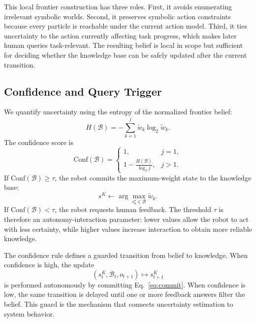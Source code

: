 This local frontier construction has three roles. First, it avoids enumerating irrelevant symbolic worlds. Second, it preserves symbolic action constraints because every particle is reachable under the current action model. Third, it ties uncertainty to the action currently affecting task progress, which makes later human queries task-relevant. The resulting belief is local in scope but sufficient for deciding whether the knowledge base can be safely updated after the current transition.

\subsection{Confidence and Query Trigger}

We quantify uncertainty using the entropy of the normalized frontier belief:
\begin{equation}
H(\mathcal{B})=-\sum_{k=1}^{j}\tilde{w}_k\log_2 \tilde{w}_k.
\label{eq:entropy}
\end{equation}
The confidence score is
\begin{equation}
\mathrm{Conf}(\mathcal{B})=
\begin{cases}
1, & j=1,\\
1-\frac{H(\mathcal{B})}{\log_2 j}, & j>1.
\end{cases}
\label{eq:confidence}
\end{equation}
If $\mathrm{Conf}(\mathcal{B})\geq \tau$, the robot commits the maximum-weight state to the knowledge base:
\begin{equation}
s^K \leftarrow \arg\max_{s_k^\star \in \mathcal{B}}\tilde{w}_k.
\label{eq:commit}
\end{equation}
If $\mathrm{Conf}(\mathcal{B})<\tau$, the robot requests human feedback. The threshold $\tau$ is therefore an autonomy-interaction parameter: lower values allow the robot to act with less certainty, while higher values increase interaction to obtain more reliable knowledge.

The confidence rule defines a guarded transition from belief to knowledge. When confidence is high, the update
\begin{equation}
(s^K_t,\mathcal{B}_t,o_{t+1}) \mapsto s^K_{t+1}
\end{equation}
is performed autonomously by committing Eq.~\ref{eq:commit}. When confidence is low, the same transition is delayed until one or more feedback answers filter the belief. This guard is the mechanism that connects uncertainty estimation to system behavior.

